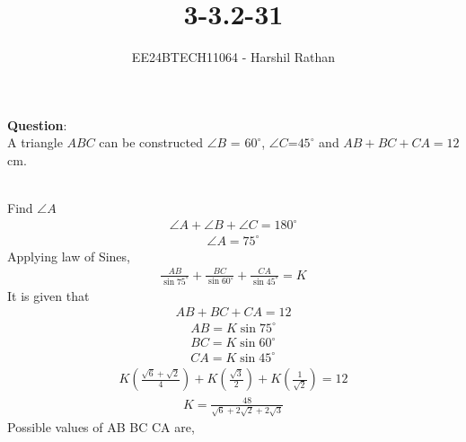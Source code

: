 \documentclass[journal]{IEEEtran}
\begin{document}

\vspace{3cm}

\title{3-3.2-31}
\author{EE24BTECH11064 - Harshil Rathan}
{\let\newpage\relax\maketitle}

\renewcommand{\thefigure}{\theenumi}
\renewcommand{\thetable}{\theenumi}
\setlength{\intextsep}{10pt} %


\renewcommand{\thetable}{\theenumi}
\textbf{Question}:\\
A triangle $ABC$ can be constructed $\angle{B}$ = $60^\circ$, $\angle{C}$=$45^\circ$ and $AB+BC+CA=12$cm.
\\
\solution \\
\begin{table}[h!]
    \centering
    
\end{table}
Find $\angle{A}$
\begin{align}
     \angle{A}+\angle{B}+\angle{C}=180^\circ 
\end{align}    
\begin{align}    
     \angle{A}=75^\circ
\end{align}
Applying law of Sines,
\begin{align}
          \frac{AB}{\sin{75^\circ}} + \frac{BC}{\sin{60^\circ}}+\frac{CA}{\sin{45^\circ}}=K
\end{align}
It is given that 
\begin{align}
 AB+BC+CA=12
\end{align}
\begin{align}
    AB =K \sin{75^\circ}\\
    BC =K \sin{60^\circ}\\
    CA =K \sin{45^\circ}
\end{align}
\begin{align}
    K(\frac{\sqrt{6}+\sqrt{2}}{4})+K(\frac{\sqrt{3}}{2})+K(\frac{1}{\sqrt{2}})=12
\end{align}
\begin{align}
    K=\frac{48}{\sqrt{6}+2\sqrt{2}+2\sqrt{3}}
\end{align}
Possible values of AB BC CA are, 
\end{document}
